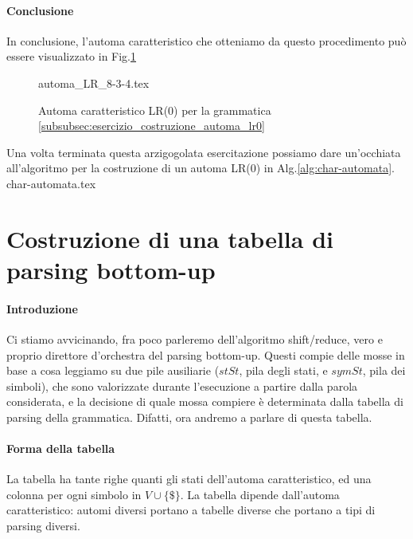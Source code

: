 \documentclass[class=book, crop=false, oneside, 12pt]{standalone}
\begin{document}
\paragraph{Conclusione}
In conclusione, l'automa caratteristico che otteniamo da questo procedimento può essere visualizzato in Fig.\ref{fig:charateristic-automata_cosntruction}
\begin{figure}[H]
    \centering
	{automa_LR_8-3-4.tex}
    \caption{Automa caratteristico LR(0) per la grammatica \ref{subsubsec:esercizio_costruzione_automa_lr0}}
    \label{fig:charateristic-automata_cosntruction}    
\end{figure}

Una volta terminata questa arzigogolata esercitazione possiamo dare un'occhiata all'algoritmo per la costruzione di un automa LR(0) in Alg.\ref{alg:char-automata}. \\
{char-automata.tex}


\section{Costruzione di una tabella di parsing bottom-up}
\paragraph{Introduzione}
Ci stiamo avvicinando, fra poco parleremo dell'algoritmo shift/reduce, vero e proprio direttore d'orchestra del parsing bottom-up. Questi compie delle mosse in base a cosa leggiamo su due pile ausiliarie (\(stSt\), pila degli stati, e \(symSt\), pila dei simboli), che sono valorizzate durante l'esecuzione a partire dalla parola considerata, e la decisione di quale mossa compiere è determinata dalla tabella di parsing della grammatica. Difatti, ora andremo a parlare di questa tabella.

\paragraph{Forma della tabella}
La tabella ha tante righe quanti gli stati dell'automa caratteristico, ed una colonna per ogni simbolo in \(V \cup \{ \$ \}\). La tabella dipende dall'automa caratteristico: automi diversi portano a tabelle diverse che portano a tipi di parsing diversi. 
\end{document}
